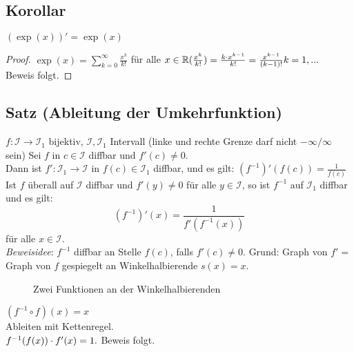 \subsection{Korollar}\label{sec:6.11}
$(\exp(x))' = \exp(x)$
\begin{proof}
$\exp(x) = \sum\limits_{k = 0}^{\infty} \frac{x^k}{k!}$ für alle $x \in \mathbb{R} \\
(\frac{x^k}{k!}) = \frac{k \cdot x^{k-1}}{k!} = \frac{x^{k-1}}{(k-1)!}\\
k = 1, ...$\\
Beweis folgt.
\end{proof}
\subsection{Satz (Ableitung der Umkehrfunktion)}\label{sec:6.12}
$f: \mathcal{I} \to \mathcal{I}_1$ bijektiv, $\mathcal{I},\mathcal{I}_1$ Intervall (linke und rechte Grenze darf nicht $-\infty/\infty$ sein)
Sei $f$ in $c \in \mathcal{I}$ diffbar und $f'(c) \ne 0$.\\
Dann ist $f': \mathcal{I}_1 \to \mathcal{I}$ in $f(c) \in \mathcal{I}_1$ diffbar, und es gilt: $(f^{-1})' (f(c)) = \frac{1}{f(c)}$\\
Ist $f$ überall auf $\mathcal{I}$ diffbar und $f'(y) \ne 0$ für alle $y \in \mathcal{I}$, so ist $f^{-1}$ auf $\mathcal{I}_1$ diffbar und es gilt: \\
\[(f^{-1})'(x) = \frac{1}{f'(f^{-1}(x))} \] für alle $x \in \mathcal{I}$.\\
\emph{Beweisidee}: $f^{-1}$ diffbar an Stelle $f(c)$, falls $f'(c) \ne 0$. Grund: Graph von $f' =$ Graph von $f$ gespiegelt an Winkelhalbierende $s(x) = x.$\\
\begin{figure}[h!]
	\centering
	\caption{Zwei Funktionen an der Winkelhalbierenden}
\end{figure}
$(f^{-1} \circ f)(x) =x$\\
Ableiten mit Kettenregel.\\
$f^{-1}(f(x)) \cdot f'(x) = 1.$ Beweis folgt.
